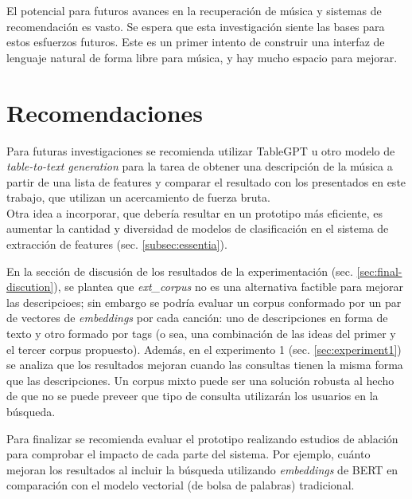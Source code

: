 El potencial para futuros avances en la recuperación de música y sistemas de recomendación es vasto. Se espera que esta investigación siente las bases para estos esfuerzos futuros. Este es un primer intento de construir una interfaz de lenguaje natural de forma libre para música, y hay mucho espacio para mejorar.

\chapter*{Recomendaciones}
\label{chap:recommendations}

Para futuras investigaciones se recomienda utilizar TableGPT \cite{Gong2020TableGPTFT} u otro modelo de \textit{table-to-text generation} para la tarea de obtener una descripción de la música a partir de una lista de features y comparar el resultado con los presentados en este trabajo, que utilizan un acercamiento de fuerza bruta. \\
Otra idea a incorporar, que debería resultar en un prototipo más eficiente, es aumentar la cantidad y diversidad de modelos de clasificación en el sistema de extracción de features (sec. \ref{subsec:essentia}).

En la sección de discusión de los resultados de la experimentación (sec. \ref{sec:final-discution}), se plantea que \textit{ext\_corpus} no es una alternativa factible para mejorar las descripcioes; sin embargo se podría evaluar un corpus conformado por un par de vectores de \textit{embeddings} por cada canción: uno de descripciones en forma de texto y otro formado por tags (o sea, una combinación de las ideas del primer y el tercer corpus propuesto). Además, en el experimento 1 (sec. \ref{sec:experiment1}) se analiza que los resultados mejoran cuando las consultas tienen la misma forma que las descripciones. Un corpus mixto puede ser una solución robusta al hecho de que no se puede preveer que tipo de consulta utilizarán los usuarios en la búsqueda.

Para finalizar se recomienda evaluar el prototipo realizando estudios de ablación para comprobar el impacto de cada parte del sistema. Por ejemplo, cuánto mejoran los resultados al incluir la búsqueda utilizando \textit{embeddings} de BERT en comparación con el modelo vectorial (de bolsa de palabras) tradicional.
